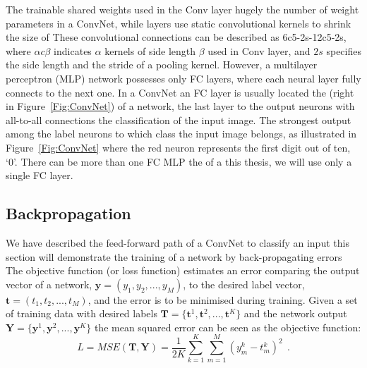 The trainable shared weights used in the Conv layer hugely \protect{} \protect{} the number of weight parameters in a ConvNet, while \protect{} \protect{} layers use static convolutional kernels to shrink the size of \protect{} \protect{}
These convolutional connections can be described as 6c5-2s-12c5-2s, where $\alpha c \beta$ indicates $\alpha$ kernels of side length $\beta$ used in \protect{} Conv layer, and $2s$ specifies the side length and the stride of a pooling kernel.
However, a multilayer perceptron (MLP) network possesses only FC layers, where each neural layer fully connects to the next one.
In a ConvNet an FC layer is usually located \protect{} \protect{} the \protect{} \protect{} (right in Figure~\ref{Fig:ConvNet}) of a network, \protect{} \protect{} the last \protect{} \protect{} layer to the output neurons with all-to-all connections \protect{} \protect{} the classification of the input image.
The strongest output among the label neurons \protect{} \protect{} to which class the input image belongs, as illustrated in Figure~\ref{Fig:ConvNet} where the red neuron represents the first digit out of ten, `0'.
There can be more than one FC \protect{} \protect{} MLP \protect{} \protect{} the \protect{} \protect{} of a \protect{} \protect{} this thesis, we will use only a single FC layer.



\subsection{Backpropagation}
We have described the feed-forward path of a ConvNet to classify an input \protect{} \protect{} this section \protect{} will demonstrate the training of a network by back-propagating errors \protect{} \protect{}
The objective function (or loss function) estimates an error \protect{} comparing the output vector of a network, $\mathbf{y}=(y_1,y_2,...,y_M)$, to the desired label vector, $\mathbf{t}=(t_1,t_2,...,t_M)$, and the error is to be minimised during training.
Given a set of training data with desired labels $\mathbf{T}=\{\mathbf{t}^1, \mathbf{t}^2, ..., \mathbf{t}^K\}$ and the network output $\mathbf{Y}=\{\mathbf{y}^1, \mathbf{y}^2, ..., \mathbf{y}^K\}$ the mean squared error can be seen as the objective function:  
\begin{equation}
L=MSE(\mathbf{T}, \mathbf{Y}) =\frac{1}{2K}\sum_{k=1}^K \sum_{m=1}^M (y^{k}_{m}-t^{k}_{m})^{2}~~.
\label{equ:loss_all}
\end{equation}

